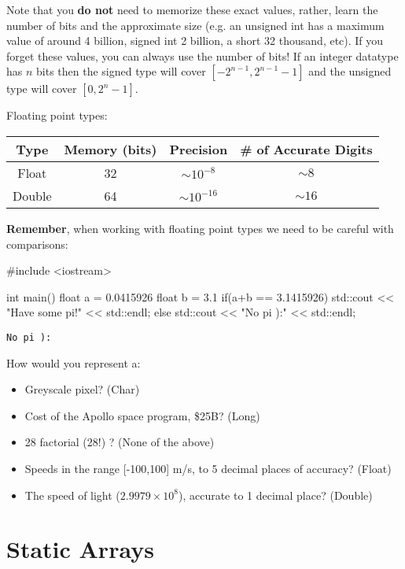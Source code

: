 \documentclass[12pt,letterpaper,twoside]{article}
\begin{document}
Note that you \textbf{do not} need to memorize these exact values, rather, learn the number of bits and the approximate size (e.g. an unsigned int has a maximum value of around 4 billion, signed int 2 billion, a short 32 thousand, etc).  If you forget these values, you can always use the number of bits!  If an integer datatype has $n$ bits then the signed type will cover $[-2^{n-1},2^{n-1}-1]$ and the unsigned type will cover $[0,2^{n}-1]$.

Floating point types:
\begin{table}[!h]
\centering
\begin{tabular}{c|c|c|c}
Type & Memory (bits) & Precision & \# of Accurate Digits  \\\hline \hline
Float & 32 & $\sim 10^{-8}$ & $\sim 8$ \\
Double & 64 & $\sim 10^{-16}$ & $\sim 16$ \\ \hline
\end{tabular}
\end{table}

\textbf{Remember}, when working with floating point types we need to be careful with comparisons:
\begin{cpp}
#include <iostream>

int main() {
  float a = 0.0415926
  float b = 3.1
  if(a+b == 3.1415926){
    std::cout << "Have some pi!" << std::endl;
  }
  else{
    std::cout << "No pi ):" << std::endl;
  }
}
\end{cpp}
\vspace{-3ex}
{
\footnotesize
\begin{verbatim}
No pi ):
\end{verbatim}
}

How would you represent a:
\begin{itemize}
	\item Greyscale pixel? (Char)
	\item Cost of the Apollo space program, \$25B? (Long)
	\item 28 factorial (28!) ? (None of the above)
  \item Speeds in the range [-100,100] m/s, to 5 decimal places of accuracy? (Float)
  \item The speed of light ($2.9979 \times 10^8$), accurate to 1 decimal place? (Double)
\end{itemize}

\newpage
\section{Static Arrays}
\end{document}
